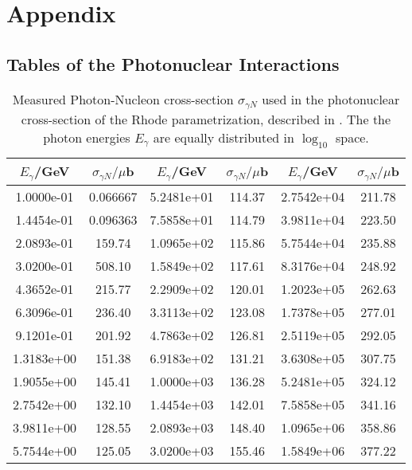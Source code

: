 \chapter{Appendix}


\section{Tables of the Photonuclear Interactions} \label{sec:photo_tables}

\begin{table}
    \centering
    \caption{Measured Photon-Nucleon cross-section $\sigma_{\gamma N}$ used in the photonuclear cross-section of the Rhode parametrization\cite{Rhode93PhD}, described in . The the photon energies $E_\gamma$ are equally distributed in $\log_{10}$ space.}
    \label{tab:photo_rhode_data}
    \begin{tabular}{S[table-format=1.4e+1] S[table-format=3.6] | S S[table-format=3.2] | S S[table-format=3.2]}
        \toprule
        {$E_\gamma$/GeV} & {$\sigma_{\gamma N}/\mu$b} & {$E_\gamma$/GeV} & {$\sigma_{\gamma N}/\mu$b} & {$E_\gamma$/GeV} & {$\sigma_{\gamma N}/\mu$b} \\
        \midrule
        1.0000e-01 & 0.066667 & 5.2481e+01 & 114.37 & 2.7542e+04 & 211.78 \\
        1.4454e-01 & 0.096363 & 7.5858e+01 & 114.79 & 3.9811e+04 & 223.50 \\
        2.0893e-01 & 159.74 & 1.0965e+02 & 115.86 & 5.7544e+04 & 235.88 \\
        3.0200e-01 & 508.10 & 1.5849e+02 & 117.61 & 8.3176e+04 & 248.92 \\
        4.3652e-01 & 215.77 & 2.2909e+02 & 120.01 & 1.2023e+05 & 262.63 \\
        6.3096e-01 & 236.40 & 3.3113e+02 & 123.08 & 1.7378e+05 & 277.01 \\
        9.1201e-01 & 201.92 & 4.7863e+02 & 126.81 & 2.5119e+05 & 292.05 \\
        1.3183e+00 & 151.38 & 6.9183e+02 & 131.21 & 3.6308e+05 & 307.75 \\
        1.9055e+00 & 145.41 & 1.0000e+03 & 136.28 & 5.2481e+05 & 324.12 \\
        2.7542e+00 & 132.10 & 1.4454e+03 & 142.01 & 7.5858e+05 & 341.16 \\
        3.9811e+00 & 128.55 & 2.0893e+03 & 148.40 & 1.0965e+06 & 358.86 \\
        5.7544e+00 & 125.05 & 3.0200e+03 & 155.46 & 1.5849e+06 & 377.22 \\

\end{tabular}
\end{table}
